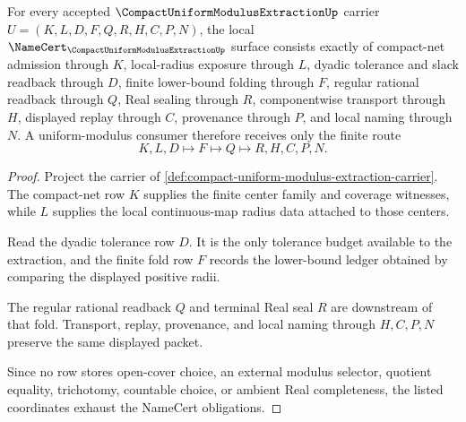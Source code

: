 \begin{theorem}
\label{thm:compact-uniform-modulus-extraction-obligations}
For every accepted $\CompactUniformModulusExtractionUp$ carrier $U=(K,L,D,F,Q,R,H,C,P,N)$, the local $\NameCert_{\CompactUniformModulusExtractionUp}$ surface consists exactly of compact-net admission through $K$, local-radius exposure through $L$, dyadic tolerance and slack readback through $D$, finite lower-bound folding through $F$, regular rational readback through $Q$, Real sealing through $R$, componentwise transport through $H$, displayed replay through $C$, provenance through $P$, and local naming through $N$. A uniform-modulus consumer therefore receives only the finite route
$$
K,L,D \longmapsto F \longmapsto Q \longmapsto R,H,C,P,N .
$$
\end{theorem}
\begin{proof}
Project the carrier of \autoref{def:compact-uniform-modulus-extraction-carrier}. The compact-net row $K$ supplies the finite center family and coverage witnesses, while $L$ supplies the local continuous-map radius data attached to those centers.

Read the dyadic tolerance row $D$. It is the only tolerance budget available to the extraction, and the finite fold row $F$ records the lower-bound ledger obtained by comparing the displayed positive radii.

The regular rational readback $Q$ and terminal Real seal $R$ are downstream of that fold. Transport, replay, provenance, and local naming through $H,C,P,N$ preserve the same displayed packet.

Since no row stores open-cover choice, an external modulus selector, quotient equality, trichotomy, countable choice, or ambient Real completeness, the listed coordinates exhaust the NameCert obligations.
\end{proof}

